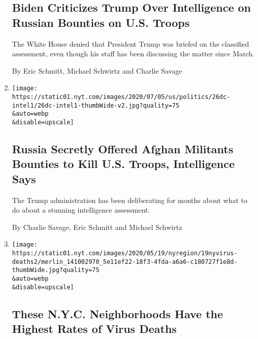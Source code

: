 \begin{enumerate}
  \hypertarget{biden-criticizes-trump-over-intelligence-on-russian-bounties-on-us-troops}{%
  \subsection{Biden Criticizes Trump Over Intelligence on Russian
  Bounties on U.S.
  Troops}\label{biden-criticizes-trump-over-intelligence-on-russian-bounties-on-us-troops}}

  The White House denied that President Trump was briefed on the
  classified assessment, even though his staff has been discussing the
  matter since March.

  By Eric Schmitt, Michael Schwirtz and Charlie Savage
\item
  \href{/2020/06/26/us/politics/russia-afghanistan-bounties.html}{}

  \texttt{[image: https://static01.nyt.com/images/2020/07/05/us/politics/26dc-intel1/26dc-intel1-thumbWide-v2.jpg?quality=75\\\&auto=webp\\\&disable=upscale]}

  \hypertarget{russia-secretly-offered-afghan-militants-bounties-to-kill-us-troops-intelligence-says}{%
  \subsection{Russia Secretly Offered Afghan Militants Bounties to Kill
  U.S. Troops, Intelligence
  Says}\label{russia-secretly-offered-afghan-militants-bounties-to-kill-us-troops-intelligence-says}}

  The Trump administration has been deliberating for months about what
  to do about a stunning intelligence assessment.

  By Charlie Savage, Eric Schmitt and Michael Schwirtz
\item
  \href{/2020/05/18/nyregion/coronavirus-deaths-nyc.html}{}

  \texttt{[image: https://static01.nyt.com/images/2020/05/19/nyregion/19nyvirus-deaths2/merlin\_141002970\_5e11ef22-18f3-4fda-a6a6-c180727f1e8d-thumbWide.jpg?quality=75\\\&auto=webp\\\&disable=upscale]}

  \hypertarget{these-nyc-neighborhoods-have-the-highest-rates-of-virus-deaths}{%
  \subsection{These N.Y.C. Neighborhoods Have the Highest Rates of Virus
  Deaths}\label{these-nyc-neighborhoods-have-the-highest-rates-of-virus-deaths}}


\end{enumerate}

